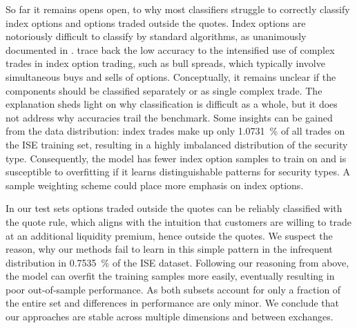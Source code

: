 So far it remains opens open, to why most classifiers struggle to correctly classify index options and options traded outside the quotes. Index options are notoriously difficult to classify by standard algorithms, as unanimously documented in \textcites[][898-898]{savickasInferringDirectionOption2003}[][20]{grauerOptionTradeClassification2022}. \textcite[][898-898]{savickasInferringDirectionOption2003} trace back the low accuracy to the intensified use of complex trades in index option trading, such as bull spreads, which typically involve simultaneous buys and sells of options. Conceptually, it remains unclear if the components should be classified separately or as single complex trade. The explanation sheds light on why classification is difficult as a whole, but it does not address why accuracies trail the benchmark.  Some insights can be gained from the data distribution: index trades make up only \SI{1.0731}{\percent} of all trades on the \gls{ISE} training set, resulting in a highly imbalanced distribution of the security type. Consequently, the model has fewer index option samples to train on and is susceptible to overfitting if it learns distinguishable patterns for security types. A sample weighting scheme could place more emphasis on index options. 

In our test sets options traded outside the quotes can be reliably classified with the quote rule, which aligns with the intuition that customers are willing to trade at an additional liquidity premium, hence outside the quotes. We suspect the reason, why our methods fail to learn in this simple pattern in the infrequent distribution in \SI{0.7535}{\percent} of the \gls{ISE} dataset. Following our reasoning from above, the model can overfit the training samples more easily, eventually resulting in poor out-of-sample performance. As both subsets account for only a fraction of the entire set and differences in performance are only minor. We conclude that our approaches are stable across multiple dimensions and between exchanges.

